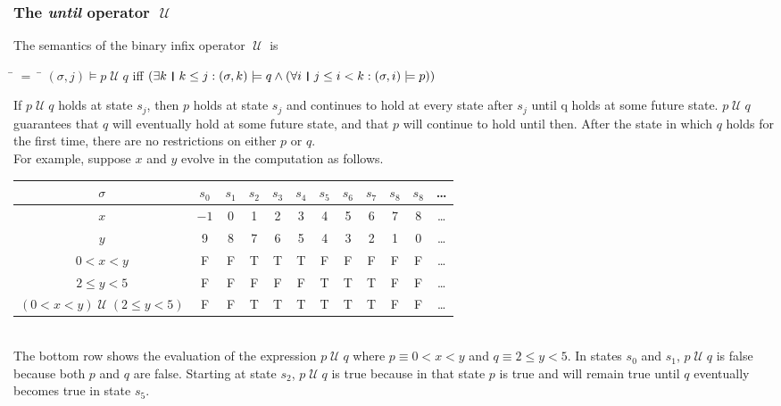 \documentclass[fleqn, leqno]{article}
\newcommand{\mymathindent}{24pt}                    %
\newcommand{\Until}{\;\mathcal{U}\;}
\newcommand{\thedr}{\rule[-.25ex]{.32mm}{1.75ex}}   %
\newcommand{\dr}{\;\,\thedr\,\;}                    %
\newcommand{\rb}{:}                                 %
\newcommand{\all}{\forall}                          %
\newcommand{\ext}{\exists}                          %
\begin{document}
\subsubsection*{The \textit{until} operator $\Until$}

The semantics of the binary infix operator $\Until$ is

\begin{tabbing}
\hspace{\mymathindent} \= $= \;$ \= \kill
  \> $(\sigma, j) \models p \Until q$ \quad iff \quad $(\ext k \dr k \le j \rb (\sigma,k) \models q \land
      (\all i \dr j\le i < k \rb (\sigma,i) \models p))$
\end{tabbing}

If $p \Until q$ holds at state $s_j$, then $p$ holds at state $s_j$ and continues to hold at every state
after $s_j$ until q holds at some future state.
$p \Until q$ guarantees that $q$ will eventually hold at some future state, and that $p$ will continue to
hold until then.
After the state in which $q$ holds for the first time, there are no restrictions on either $p$ or $q$.\\

For example, suppose $x$ and $y$ evolve in the computation as follows.\\

\begin{tabular}{c|ccccccccccc}
  $\sigma$                  & $s_0$ & $s_1$ & $s_2$ & $s_3$ & $s_4$ & $s_5$ & $s_6$ & $s_7$ & $s_8$ & $s_8$ & \dots \\
  \hline
  $x$                       & $-1$  & 0     & 1     & 2     & 3     & 4     & 5     &  6    &  7    &  8    &  \dots\\
  $y$                       & 9     & 8     & 7     & 6     & 5     & 4     & 3     &  2    &  1    &  0    &  \dots\\
  $0<x<y$                   & F     & F     & T     & T     & T     & F     & F     &  F    &  F    &  F    &  \dots\\
  $2\le y<5$                & F     & F     & F     & F     & F     & T     & T     &  T    &  F    &  F    &  \dots\\
  $(0<x<y)\Until(2\le y<5)$ & F     & F     & T     & T     & T     & T     & T     &  T    &  F    &  F    &  \dots\\
\end{tabular}\\

The bottom row shows the evaluation of the expression $p\Until q$ where $p\equiv 0<x<y$ and $q\equiv 2\le y<5$.
In states $s_0$ and $s_1$, $p\Until q$ is false because both $p$ and $q$ are false.
Starting at state $s_2$, $p\Until q$ is true because in that state $p$ is true and will remain true until $q$
eventually becomes true in state $s_5$.\\
\end{document}
